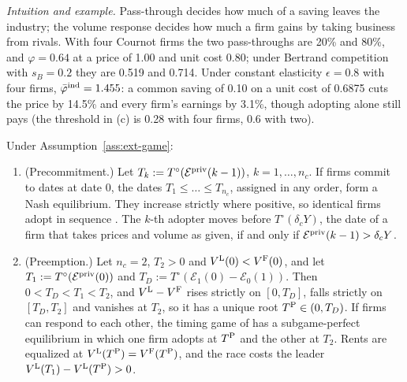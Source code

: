 \noindent\emph{Intuition and example.} Pass-through decides how much of a saving leaves the industry; the volume response decides how much a firm gains by taking business from rivals. With four Cournot firms the two pass-throughs are 20\% and 80\%, and $\varphi=0.64$ at a price of 1.00 and unit cost 0.80; under Bertrand competition with $s_B=0.2$ they are 0.519 and 0.714. Under constant elasticity $\epsilon=0.8$ with four firms, $\bar\varphi^{\rm ind}=1.455$: a common saving of 0.10 on a unit cost of 0.6875 cuts the price by 14.5\% and every firm's earnings by 3.1\%, though adopting alone still pays (the threshold in (c) is 0.28 with four firms, 0.6 with two).

\begin{proposition}\label{prop:ext-game-preempt}
Under Assumption~\ref{ass:ext-game}:
\begin{enumerate}
\item[(a)] (Precommitment.) Let $T_k:=T^\circ(\mathcal E^{\rm priv}(k-1))$, $k=1,\dots,n_c$. If firms commit to dates at date 0, the dates $T_1\le\dots\le T_{n_c}$, assigned in any order, form a Nash equilibrium. They increase strictly where positive, so identical firms adopt in sequence \citep{reinganum1981diffusion,reinganum1981market}. The $k$-th adopter moves before $T^\circ(\delta_cY)$, the date of a firm that takes prices and volume as given, if and only if $\mathcal E^{\rm priv}(k-1)>\delta_cY$.
\item[(b)] (Preemption.) Let $n_c=2$, $T_2>0$ and $V^{\rm L}(0)<V^{\rm F}(0)$, and let $T_1:=T^\circ(\mathcal E^{\rm priv}(0))$ and $T_D:=T^\circ(\mathcal E_1(0)-\mathcal E_0(1))$. Then $0<T_D<T_1<T_2$, and $V^{\rm L}-V^{\rm F}$ rises strictly on $[0,T_D]$, falls strictly on $[T_D,T_2]$ and vanishes at $T_2$, so it has a unique root $T^{\rm P}\in(0,T_D)$. If firms can respond to each other, the timing game of \citet{fudenberg1985preemption} has a subgame-perfect equilibrium in which one firm adopts at $T^{\rm P}$ and the other at $T_2$. Rents are equalized at $V^{\rm L}(T^{\rm P})=V^{\rm F}(T^{\rm P})$, and the race costs the leader $V^{\rm L}(T_1)-V^{\rm L}(T^{\rm P})>0$.
\end{enumerate}
\end{proposition}

